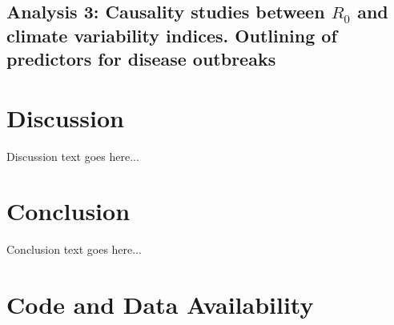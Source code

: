 \documentclass[
	a4paper, %
	8pt, %
	unnumberedsections, %
	twoside, %
]{LTJournalArticle}
\begin{document}
  \subsection{Analysis 3: Causality studies between $R_0$ and climate variability indices. Outlining of predictors for disease outbreaks} \label{sec-results-3}

  \section{Discussion}

  Discussion text goes here...

  \section{Conclusion}

  Conclusion text goes here...

  \section{Code and Data Availability}




  \nocite{*}
  \printbibliography

\end{document}
